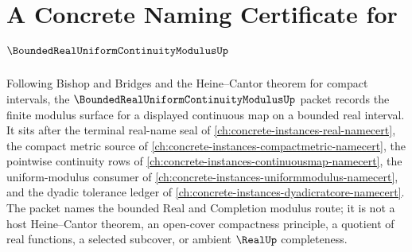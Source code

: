 \chapter{A Concrete Naming Certificate for $\BoundedRealUniformContinuityModulusUp$}
\label{ch:concrete-instances-bounded-real-uniform-continuity-modulus-namecert}

Following Bishop and Bridges and the Heine--Cantor theorem for compact intervals, the $\BoundedRealUniformContinuityModulusUp$ packet records the finite modulus surface for a displayed continuous map on a bounded real interval. It sits after the terminal real-name seal of \autoref{ch:concrete-instances-real-namecert}, the compact metric source of \autoref{ch:concrete-instances-compactmetric-namecert}, the pointwise continuity rows of \autoref{ch:concrete-instances-continuousmap-namecert}, the uniform-modulus consumer of \autoref{ch:concrete-instances-uniformmodulus-namecert}, and the dyadic tolerance ledger of \autoref{ch:concrete-instances-dyadicratcore-namecert}. The packet names the bounded Real and Completion modulus route; it is not a host Heine--Cantor theorem, an open-cover compactness principle, a quotient of real functions, a selected subcover, or ambient $\RealUp$ completeness.

